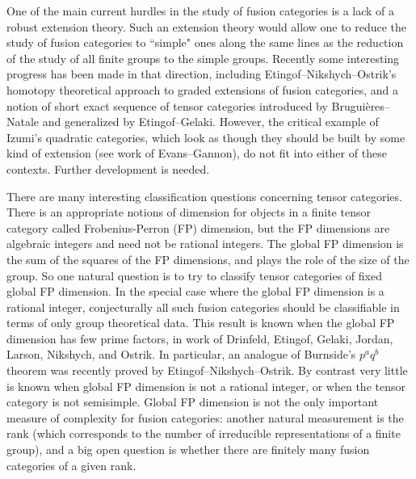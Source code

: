 \documentclass[12pt]{article}
\begin{document}
One of the main current hurdles in the study of fusion categories is a lack of a robust extension theory. Such an extension theory would allow one to reduce the study of fusion categories to ``simple" ones along the same lines as the reduction of the study of all finite groups to the simple groups. Recently some interesting progress has been made in that direction, including Etingof--Nikshych--Ostrik's homotopy theoretical approach to graded extensions of fusion categories, and a notion of short exact sequence of tensor categories introduced by Brugui\`eres--Natale and generalized by Etingof--Gelaki. However, the critical example of Izumi's quadratic categories, which look as though they should be built by some kind of extension (see work of Evans--Gannon), do not fit into either of these contexts. Further development is needed.

There are many interesting classification questions concerning tensor categories. There is an appropriate notions of dimension for objects in a finite tensor category called Frobenius-Perron (FP) dimension, but the FP dimensions are algebraic integers and need not be rational integers.  The global FP dimension is the sum of the squares of the FP dimensions, and plays the role of the size of the group. So one natural question is to try to classify tensor categories of fixed global FP dimension.  In the special case where the global FP dimension is a rational integer, conjecturally all such fusion categories should be classifiable in terms of only group theoretical data.  This result is known when the global FP dimension has few prime factors, in work of Drinfeld, Etingof, Gelaki, Jordan, Larson, Nikshych, and Ostrik. In particular, an analogue of Burnside's $p^a q^b$ theorem was recently proved by Etingof--Nikshych--Ostrik. By contrast very little is known when global FP dimension is not a rational integer, or when the tensor category is not semisimple. Global FP dimension is not the only important measure of complexity for fusion categories: another natural measurement is the rank (which corresponds to the number of irreducible representations of a finite group), and a big open question is whether there are finitely many fusion categories of a given rank.
\end{document}
